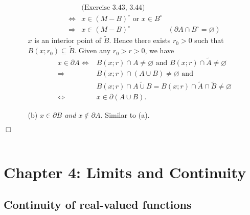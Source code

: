 \documentclass{article}
\begin{document}
\begin{enumerate}
\begin{enumerate}
\begin{align*}
    &\text{(Exercise 3.43, 3.44)} \\
  \Longleftrightarrow&
  x \in (M-B)^{\circ} \text{ or } x \in B^{\circ} \\
  \Longrightarrow&
  x \in (M-B)^{\circ}
    &(\partial A \cap B^{\circ} = \varnothing)
  \end{align*}
  $x$ is an interior point of $\widetilde{B}$.
  Hence there exists $r_0 > 0$ such that $B(x;r_0) \subseteq \widetilde{B}$.
  Given any $r_0 > r > 0$, we have
  \begin{align*}
  x \in \partial A
  \Longleftrightarrow&
  B(x;r) \cap A \neq \varnothing
  \text{ and } B(x;r) \cap \widetilde{A} \neq \varnothing \\
  \Longrightarrow&
  B(x;r) \cap (A \cup B) \neq \varnothing \text{ and }\\
  &B(x;r) \cap \widetilde{A \cup B}
  = B(x;r) \cap \widetilde{A} \cap \widetilde{B}
  \neq \varnothing \\
  \Longleftrightarrow&
  x \in \partial(A \cup B).
  \end{align*}
  \item[(b)]
  \emph{$x \in \partial B$ and $x \not\in \partial A$.}
  Similar to (a).
  \end{enumerate}
\end{enumerate}
$\Box$ \\\\






\newpage
\section*{Chapter 4: Limits and Continuity \\}



\subsection*{Continuity of real-valued functions \\}
\end{document}
